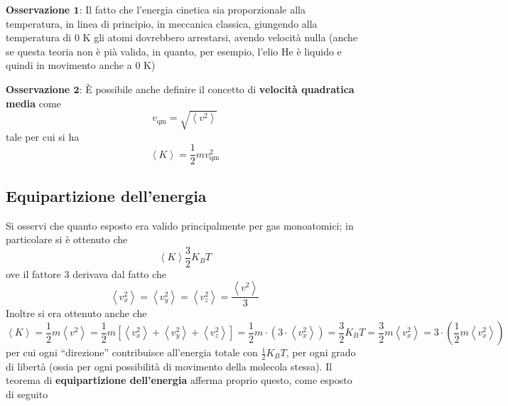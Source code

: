 \documentclass[a4paper]{extarticle}
\newcommand{\quotes}[1]{``#1''}
\begin{document}
\vspace{1em}
\noindent
\textbf{Osservazione $\boldsymbol{1}$}: Il fatto che l'energia cinetica sia proporzionale alla temperatura, in linea di principio, in meccanica classica, giungendo alla temperatura di $0$ K gli atomi dovrebbero arrestarsi, avendo velocità nulla (anche se questa teoria non è pià valida, in quanto, per esempio, l'elio He è liquido e quindi in movimento anche a $0$ K)

\vspace{1em}
\noindent
\textbf{Osservazione $\boldsymbol{2}$}: È possibile anche definire il concetto di \textbf{velocità quadratica media} come
\[v_{\text{qm}} = \sqrt{\left<v^2\right>}\]
tale per cui si ha
\[\left<K\right> = \frac{1}{2} m v_{\text{qm}}^2\]

\vspace{1em}
\subsection{Equipartizione dell'energia}
Si osservi che quanto esposto era valido principalmente per gas monoatomici; in particolare si è ottenuto che
\[\left< K \right> \frac{3}{2} K_B T\]
ove il fattore $3$ derivava dal fatto che
\[\left<v_x^2\right>=\left<v_y^2\right>=\left<v_z^2\right>=\frac{\left<v^2\right>}{3}\]
Inoltre si era ottenuto anche che
\[\left<K\right>=\frac{1}{2}m \left<v^2\right> = \frac{1}{2} m \left[\left<v_x^2\right> + \left<v_y^2\right> + \left<v_z^2\right>\right] = \frac{1}{2} m \cdot (3 \cdot \left<v_x^2\right>) = \frac{3}{2} K_B T = \frac{3}{2} m \left<v_x^2\right> = 3 \cdot \left(\frac{1}{2} m \left<v_x^2\right>\right)\]
per cui ogni \quotes{direzione} contribuisce all'energia totale con $\displaystyle{\frac{1}{2} K_B T}$, per ogni grado di libertà (ossia per ogni possibilità di movimento della molecola stessa). Il teorema di \textbf{equipartizione dell'energia} afferma proprio questo, come esposto di seguito
\end{document}
